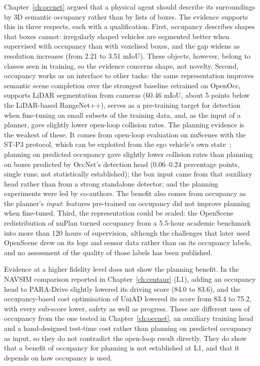 Chapter~\ref{ch:occnet} argued that a physical agent should describe its surroundings by 3D semantic occupancy rather than by lists of boxes. The evidence supports this in three respects, each with a qualification. First, occupancy describes shapes that boxes cannot: irregularly shaped vehicles are segmented better when supervised with occupancy than with voxelised boxes, and the gap widens as resolution increases (from 2.21 to 3.51 mIoU). These objects, however, belong to classes seen in training, so the evidence concerns shape, not novelty. Second, occupancy works as an interface to other tasks: the same representation improves semantic scene completion over the strongest baseline retrained on OpenOcc, supports LiDAR segmentation from cameras (60.46 mIoU, about 5 points below the LiDAR-based RangeNet++), serves as a pre-training target for detection when fine-tuning on small subsets of the training data, and, as the input of a planner, gave slightly lower open-loop collision rates. The planning evidence is the weakest of these. It comes from open-loop evaluation on nuScenes with the ST-P3 protocol, which can be exploited from the ego vehicle's own state~\cite{zhai2023rethinking,li2024ego}; planning on predicted occupancy gave slightly lower collision rates than planning on boxes predicted by OccNet's detection head (0.06--0.24 percentage points, single runs; not statistically established); the box input came from that auxiliary head rather than from a strong standalone detector; and the planning experiments were led by co-authors. The benefit also comes from occupancy as the planner's \emph{input}: features pre-trained on occupancy did not improve planning when fine-tuned. Third, the representation could be scaled: the OpenScene redistribution of nuPlan turned occupancy from a 5.5-hour academic benchmark into more than 120 hours of supervision, although the challenges that later used OpenScene drew on its logs and sensor data rather than on its occupancy labels, and no assessment of the quality of those labels has been published.

Evidence at a higher fidelity level does not show the planning benefit. In the NAVSIM comparison reported in Chapter~\ref{ch:centaur} (L1), adding an occupancy head to PARA-Drive slightly lowered its driving score (84.0 to 83.6), and the occupancy-based cost optimisation of UniAD lowered its score from 83.4 to 75.2, with every sub-score lower, safety as well as progress. These are different uses of occupancy from the one tested in Chapter~\ref{ch:occnet}, an auxiliary training head and a hand-designed test-time cost rather than planning on predicted occupancy as input, so they do not contradict the open-loop result directly. They do show that a benefit of occupancy for planning is not established at L1, and that it depends on how occupancy is used.

